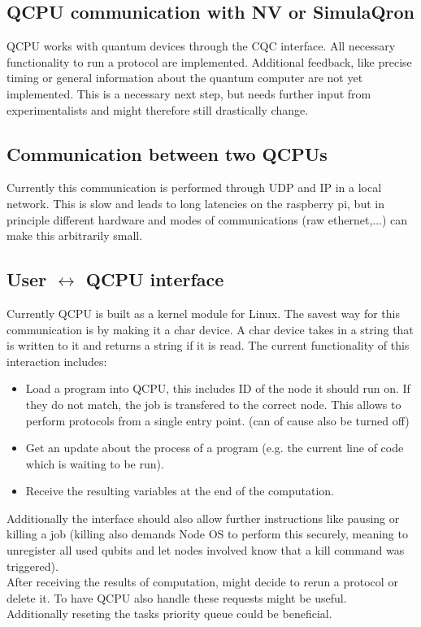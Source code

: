 \documentclass[]{article}
\begin{document}
\subsection{QCPU communication with NV or SimulaQron}
QCPU works with quantum devices through the CQC interface. All necessary functionality to run a protocol are implemented. Additional feedback, like precise timing or general information about the quantum computer are not yet implemented. This is a necessary next step, but needs further input from experimentalists and might therefore still drastically change.
\subsection{Communication between two QCPUs}
Currently this communication is performed through UDP and IP in a local network. This is slow and leads to long latencies on the raspberry pi, but in principle different hardware and modes of communications (raw ethernet,...) can make this arbitrarily small.
\subsection{User $\leftrightarrow$ QCPU interface}
Currently QCPU is built as a kernel module for Linux. The savest way for this communication is by making it a char device. A char device takes in a string that is written to it and returns a string if it is read. The current functionality of this interaction includes:
\begin{itemize}
	\item Load a program into QCPU, this includes ID of the node it should run on. If they do not match, the job is transfered to the correct node. This allows to perform protocols from a single entry point. (can of cause also be turned off)
	\item Get an update about the process of a program (e.g. the current line of code which is waiting to be run).
	\item Receive the resulting variables at the end of the computation.
\end{itemize}
Additionally the interface should also allow further instructions like pausing or killing a job (killing also demands Node OS to perform this securely, meaning to unregister all used qubits and let nodes involved know that a kill command was triggered).\\
After receiving the results of computation, might decide to rerun a protocol or delete it. To have QCPU also handle these requests might be useful.\\
Additionally reseting the tasks priority queue could be beneficial.
\end{document}
